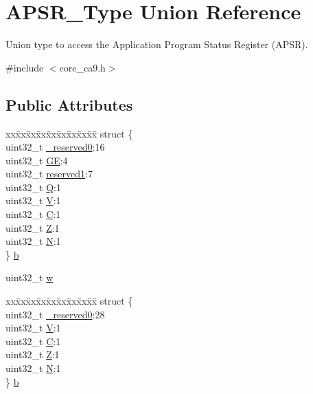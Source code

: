 \hypertarget{unionAPSR__Type}{}\section{A\+P\+S\+R\+\_\+\+Type Union Reference}
\label{unionAPSR__Type}


Union type to access the Application Program Status Register (A\+P\+SR).  




{\ttfamily \#include $<$core\+\_\+ca9.\+h$>$}

\subsection*{Public Attributes}
\begin{DoxyCompactItemize}
\item 
\begin{tabbing}
xx\=xx\=xx\=xx\=xx\=xx\=xx\=xx\=xx\=\kill
struct \{\\
\>uint32\_t \hyperlink{unionAPSR__Type_afbce95646fd514c10aa85ec0a33db728}{\_reserved0}:16\\
\>uint32\_t \hyperlink{unionAPSR__Type_adcb98a5b9c93b0cb69cdb7af5638f32e}{GE}:4\\
\>uint32\_t \hyperlink{unionAPSR__Type_a268939f602ca41cb4f1f71d7f0eae806}{reserved1}:7\\
\>uint32\_t \hyperlink{unionAPSR__Type_a22d10913489d24ab08bd83457daa88de}{Q}:1\\
\>uint32\_t \hyperlink{unionAPSR__Type_a8004d224aacb78ca37774c35f9156e7e}{V}:1\\
\>uint32\_t \hyperlink{unionAPSR__Type_a86e2c5b891ecef1ab55b1edac0da79a6}{C}:1\\
\>uint32\_t \hyperlink{unionAPSR__Type_a3b04d58738b66a28ff13f23d8b0ba7e5}{Z}:1\\
\>uint32\_t \hyperlink{unionAPSR__Type_a7e7bbba9b00b0bb3283dc07f1abe37e0}{N}:1\\
\} \hyperlink{unionAPSR__Type_aaf8972e1f4a81818ee4ad5acc6ddb1f0}{b}\\

\end{tabbing}\item 
uint32\+\_\+t \hyperlink{unionAPSR__Type_ae4c2ef8c9430d7b7bef5cbfbbaed3a94}{w}
\item 
\begin{tabbing}
xx\=xx\=xx\=xx\=xx\=xx\=xx\=xx\=xx\=\kill
struct \{\\
\>uint32\_t \hyperlink{unionAPSR__Type_afbce95646fd514c10aa85ec0a33db728}{\_reserved0}:28\\
\>uint32\_t \hyperlink{unionAPSR__Type_a8004d224aacb78ca37774c35f9156e7e}{V}:1\\
\>uint32\_t \hyperlink{unionAPSR__Type_a86e2c5b891ecef1ab55b1edac0da79a6}{C}:1\\
\>uint32\_t \hyperlink{unionAPSR__Type_a3b04d58738b66a28ff13f23d8b0ba7e5}{Z}:1\\
\>uint32\_t \hyperlink{unionAPSR__Type_a7e7bbba9b00b0bb3283dc07f1abe37e0}{N}:1\\
\} \hyperlink{unionAPSR__Type_a58bbe4a401dd92b53a0e9e2ab20486a9}{b}\\


\end{tabbing}
\end{DoxyCompactItemize}
